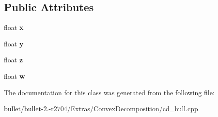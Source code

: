 \subsection*{Public Attributes}
\begin{DoxyCompactItemize}
\item 
\hypertarget{class_convex_decomposition_1_1float4_ae1b12b990fb7f862e2bff21c705c49a1}{float {\bfseries x}}\label{class_convex_decomposition_1_1float4_ae1b12b990fb7f862e2bff21c705c49a1}

\item 
\hypertarget{class_convex_decomposition_1_1float4_a0b25e326d779ff06d1805a3d7cbdc3d6}{float {\bfseries y}}\label{class_convex_decomposition_1_1float4_a0b25e326d779ff06d1805a3d7cbdc3d6}

\item 
\hypertarget{class_convex_decomposition_1_1float4_aa51313d5b70eaa7310a668e9d05c1dd9}{float {\bfseries z}}\label{class_convex_decomposition_1_1float4_aa51313d5b70eaa7310a668e9d05c1dd9}

\item 
\hypertarget{class_convex_decomposition_1_1float4_ae57bbebaa6272889cdbae58164318154}{float {\bfseries w}}\label{class_convex_decomposition_1_1float4_ae57bbebaa6272889cdbae58164318154}

\end{DoxyCompactItemize}


The documentation for this class was generated from the following file\+:\begin{DoxyCompactItemize}
\item 
bullet/bullet-\/2.-\/r2704/\+Extras/\+Convex\+Decomposition/cd\+\_\+hull.\+cpp\end{DoxyCompactItemize}
